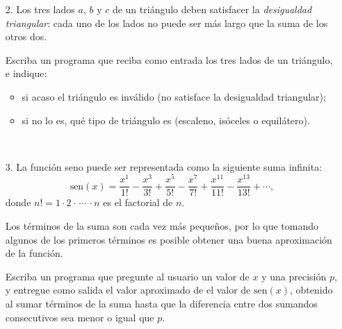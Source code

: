 \documentclass[11pt,spanish]{article}
\begin{document}
\begin{enumerate}[font=\Large\bfseries]
    \newpage
    \item[2.]
      Los tres lados \(a\), \(b\) y \(c\) de un triángulo
      deben satisfacer la \emph{desigualdad triangular}:
      cada uno de los lados no puede ser más
      largo que la suma de los otros dos.

      Escriba un programa que reciba como entrada
      los tres lados de un triángulo, e indique:
      \begin{itemize}
        \item si acaso el triángulo es inválido
          (no satisface la desigualdad triangular);
        \item si no lo es, qué tipo de triángulo es
          (escaleno, isóceles o equilátero).
      \end{itemize}

      \begin{minipage}[t]{.40\textwidth}
        
      \end{minipage}
      \hfil
      \begin{minipage}[t]{.40\textwidth}
        
      \end{minipage}
      \\
      \begin{minipage}[t]{.40\textwidth}
        
      \end{minipage}
      \hfil
      \begin{minipage}[t]{.40\textwidth}
        
      \end{minipage}

    \newpage
    \item[3.]
      La función seno puede ser representada
      como la siguiente suma infinita:
      \[
        \text{sen}(x) =
          \frac{x^{ 1}}{{ 1}!} -
          \frac{x^{ 3}}{{ 3}!} +
          \frac{x^{ 5}}{{ 5}!} -
          \frac{x^{ 7}}{{ 7}!} +
          \frac{x^{11}}{{11}!} -
          \frac{x^{13}}{{13}!} +
          \cdots,
      \]
      donde \(n! = 1\cdot 2\cdot\,\cdots\,\cdot n\)
      es el factorial de \(n\).

      Los términos de la suma son cada vez más pequeños,
      por lo que tomando algunos de los primeros términos
      es posible obtener una buena aproximación de la función.

      Escriba un programa que pregunte al usuario
      un valor de \(x\) y una precisión \(p\),
      y entregue como salida el valor aproximado de el valor de \(\text{sen}(x)\),
      obtenido al sumar términos de la suma
      hasta que la diferencia entre dos sumandos consecutivos
      sea menor o igual que \(p\).


\end{enumerate}
\end{document}
